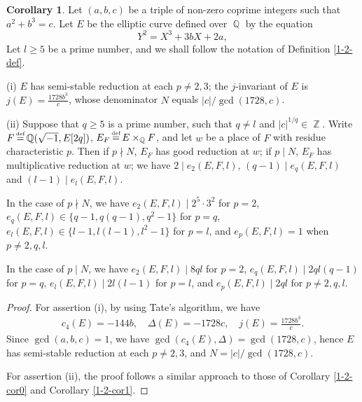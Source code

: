 \documentclass[a4paper, 12pt]{article}
\DeclareMathOperator{\defeq}{\overset{\text{\tiny{def}}}{=}}
\DeclareMathOperator{\Z}{\mathbb{Z}}
\DeclareMathOperator{\Q}{\mathbb{Q}}
\numberwithin{equation}{section}
\theoremstyle{definition}
\newtheorem{cor}[thm]{Corollary}
\begin{document}
\begin{cor} \label{1-2-cor2}
Let $(a,b,c)$ be a triple of non-zero coprime integers such that $a^2 + b^3 = c$.
Let $E$ be the elliptic curve defined over $\Q$ by the equation 
$$Y^2 = X^3 + 3bX + 2a,$$
Let $l\ge 5$ be a prime number, and we shall follow the notation of Definition \ref{1-2-def}.

(i) $E$ has semi-stable reduction at each $p\neq 2,3$;
the $j$-invariant of $E$ is $j(E) = \frac{1728b^3}{c}$,
whose denominator $N$ equals $|c| / \gcd(1728, c)$.

(ii) Suppose that $q\ge 5$ is a prime number, such that $q\neq l$ and $|c|^{1/q} \in \Z$.
Write $F \defeq \Q(\sqrt{-1}, E[2q])$,  $E_F \defeq E\times_{\Q} F$, and let $w$ be a place of $F$ with residue characteristic $p$. 
Then if $p \nmid N$, $E_F$ has good reduction at $w$; if $p \mid N$, $E_F$ has multiplicative reduction at $w$; we have $2\mid e_2(E,F,l)$, $(q-1)\mid e_q(E,F,l)$ and $(l-1) \mid e_l(E,F,l)$.

In the case of $p \nmid N$, we have 
$e_2(E,F,l) \mid 2^5\cdot 3^2$ for $p=2$, $e_q(E,F,l) \in \{q-1, q(q-1), q^2-1 \}$ for $p=q$, $e_l(E,F,l) \in \{l-1, l(l-1), l^2-1\}$ for $p=l$, and $e_p(E,F,l) = 1$ when $p\neq 2, q, l$.

In the case of $p \mid N$, we have
$e_2(E,F,l) \mid 8ql$ for $p=2$, $e_q(E,F,l) \mid 2ql(q-1)$ for $p=q$, $e_l(E,F,l) \mid 2 l (l-1)$ for $p=l$, and $e_p(E,F,l) \mid 2ql$ for $p\neq 2, q, l$.
\end{cor}
\begin{proof}
For assertion (i), by using Tate's algorithm, we have 
\small\begin{align*}
c_4(E) = -144 b, \quad
\Delta(E) = -1728c, \quad 
j(E) = \frac{1728b^3}{c}.
\end{align*}\normalsize
Since $\gcd(a,b,c) = 1$, we have $\gcd(c_4(E), \Delta) = \gcd(1728, c)$, hence $E$ has semi-stable reduction at each $p\neq 2,3$, and $N = |c|/\gcd(1728, c)$.

For assertion (ii), the proof follows a similar approach to those of Corollary \ref{1-2-cor0} and Corollary \ref{1-2-cor1}.
\end{proof}
\end{document}
